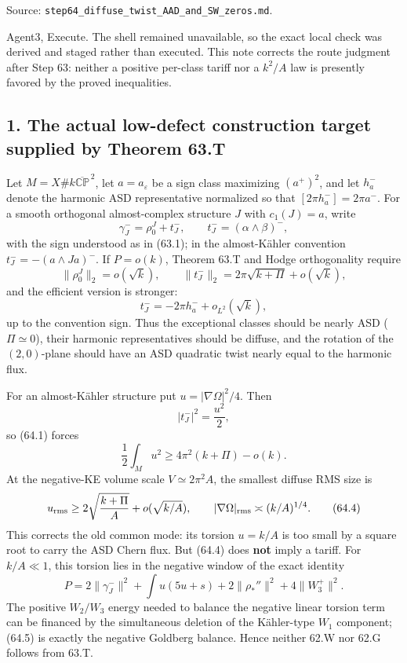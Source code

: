 \documentclass[
  10pt,
]{report}
\begin{document}
Source: \texttt{step64\_diffuse\_twist\_AAD\_and\_SW\_zeros.md}.

Agent3, Execute. The shell remained unavailable, so the exact local
check was derived and staged rather than executed. This note corrects
the route judgment after Step 63: neither a positive per-class tariff
nor a \(k^2/A\) law is presently favored by the proved inequalities.

\hypertarget{the-actual-low-defect-construction-target-supplied-by-theorem-63.t}{%
\subsection{1. The actual low-defect construction target supplied by
Theorem
63.T}\label{the-actual-low-defect-construction-target-supplied-by-theorem-63.t}}

Let \(M=X\#k\overline{\mathbb {CP}}^{\,2}\), let \(a=a_\varepsilon\) be
a sign class maximizing \((a^+)^2\), and let \(h_a^-\) denote the
harmonic ASD representative normalized so that
\([2\pi h_a^-]=2\pi a^-\). For a smooth orthogonal almost-complex
structure \(J\) with \(c_1(J)=a\), write \[
 \gamma_J^-=\rho_0^J+t_J^-,\qquad t_J^-=(\alpha\wedge\beta)^-,
\] with the sign understood as in (63.1); in the almost-Kähler
convention \(t_J^-=-(a\wedge Ja)^-\). If \(P=o(k)\), Theorem 63.T and
Hodge orthogonality require \[
 \|\rho_0^J\|_2=o(\sqrt{k}),\qquad
 \|t_J^-\|_2=2\pi\sqrt{k+\Pi}+o(\sqrt{k}),
\tag{64.1}
\] and the efficient version is stronger: \[
 t_J^-=-2\pi h_a^-+o_{L^2}(\sqrt{k}),
\tag{64.2}
\] up to the convention sign. Thus the exceptional classes should be
nearly ASD (\(\Pi\simeq0\)), their harmonic representatives should be
diffuse, and the rotation of the \((2,0)\)-plane should have an ASD
quadratic twist nearly equal to the harmonic flux.

For an almost-Kähler structure put \(u=|\nabla\Omega|^2/4\). Then \[
 |t_J^-|^2=\frac{u^2}{2},
\] so (64.1) forces \[
 \frac12\int_Mu^2\ge4\pi^2(k+\Pi)-o(k).
\tag{64.3}
\] At the negative-KE volume scale \(V\simeq2\pi^2A\), the smallest
diffuse RMS size is \[
 u_{\rm rms}\ge 2\sqrt{\frac{k+\Pi}{A}}+o(\sqrt{k/A}),
 \qquad |\nabla\Omega|_{\rm rms}\asymp (k/A)^{1/4}.
\tag{64.4}
\] This corrects the old common mode: its torsion \(u=k/A\) is too small
by a square root to carry the ASD Chern flux. But (64.4) does
\textbf{not} imply a tariff. For \(k/A\ll1\), this torsion lies in the
negative window of the exact identity \[
 P=2\|\gamma_J^-\|^2+\int u(5u+s)+2\|\rho_*''\|^2+4\|W_3^+\|^2.
\tag{64.5}
\] The positive \(W_2/W_3\) energy needed to balance the negative linear
torsion term can be financed by the simultaneous deletion of the
Kähler-type \(W_1\) component; (64.5) is exactly the negative Goldberg
balance. Hence neither 62.W nor 62.G follows from 63.T.
\end{document}
